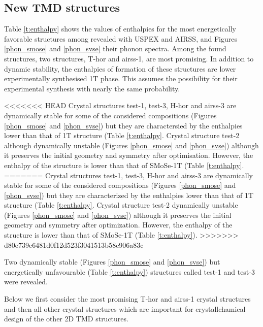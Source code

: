 \documentclass[a4paperm]{article}
\begin{document}
		\subsection{New TMD structures}

Table \ref{t:enthalpy} shows the values of enthalpies for the most energetically favorable structures among revealed with USPEX and AIRSS, and Figures \ref{phon_smose} and  \ref{phon_svse} their phonon spectra. 
Among the found structures, two structures, T-hor and airss-1, are most promising.
In addition to dynamic stability, the enthalpies of formation of these structures are lower experimentally synthesised 1T phase.
This assumes the possibility for their experimental synthesis with nearly the same probability.

<<<<<<< HEAD
Crystal structures test-1, test-3, H-hor and airss-3 are dynamically stable for some of the considered compositions (Figures \ref{phon_smose} and  \ref{phon_svse}) but they are charactersied by the enthalpies lower than that of 1T structure (Table \ref{t:enthalpy}. 
Crystal structure test-2 although dynamically unstable (Figures \ref{phon_smose} and  \ref{phon_svse}) although it preserves the initial geometry and symmetry after optimisation.
However, the enthalpy of the structure is lower than that of SMoSe-1T  (Table \ref{t:enthalpy}.
=======
Crystal structures test-1, test-3, H-hor and airss-3 are dynamically stable for some of the considered compositions (Figures \ref{phon_smose} and  \ref{phon_svse}) but they are characterized by the enthalpies lower than that of 1T structure (Table \ref{t:enthalpy}. 
Crystal structure test-2 dynamically unstable (Figures \ref{phon_smose} and \ref{phon_svse}) although it preserves the initial geometry and symmetry after optimization.
However, the enthalpy of the structure is lower than that of SMoSe-1T  (Table \ref{t:enthalpy}).
>>>>>>> d80e739c6481d0f12d523f3041513b58c906a83c

Two dynamically stable (Figures \ref{phon_smose} and  \ref{phon_svse}) but energetically unfavourable (Table \ref{t:enthalpy}) structures called test-1 and test-3 were revealed.

Below we first consider the most promising T-hor and airss-1 crystal structures and then all other crystal structures which are important for crystallchamical design of the other 2D TMD structures.


\end{document}
